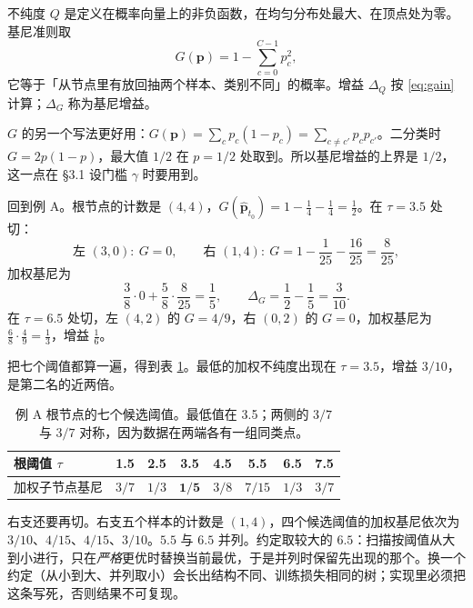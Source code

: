 \documentclass[11pt,a4paper,fontset=windows,zihao=-4]{ctexart}
\newcommand{\bp}{\mathbf{p}}
\newcommand{\tabhead}{\sffamily\bfseries\color{navy}}
\begin{document}
\begin{dfn}[不纯度与基尼增益]
不纯度 $Q$ 是定义在概率向量上的非负函数，在均匀分布处最大、在顶点处为零。基尼准则取
\[
  G(\bp)=1-\sum_{c=0}^{C-1}p_c^2 ,
\]
它等于「从节点里有放回抽两个样本、类别不同」的概率。增益 $\Delta_Q$ 按 \eqref{eq:gain} 计算；$\Delta_G$ 称为基尼增益。
\end{dfn}

$G$ 的另一个写法更好用：$G(\bp)=\sum_c p_c(1-p_c)=\sum_{c\ne c'}p_cp_{c'}$。二分类时 $G=2p(1-p)$，最大值 $1/2$ 在 $p=1/2$ 处取到。所以基尼增益的上界是 $1/2$，这一点在 §3.1 设门槛 $\gamma$ 时要用到。

回到例 A。根节点的计数是 $(4,4)$，$G(\widehat{\bp}_{t_0})=1-\frac14-\frac14=\frac12$。在 $\tau=3.5$ 处切：
\[
  \text{左 }(3,0):\ G=0,\qquad
  \text{右 }(1,4):\ G=1-\frac1{25}-\frac{16}{25}=\frac8{25},
\]
加权基尼为
\[
  \frac38\cdot0+\frac58\cdot\frac8{25}=\frac15,
  \qquad \Delta_G=\frac12-\frac15=\frac3{10}.
\]
在 $\tau=6.5$ 处切，左 $(4,2)$ 的 $G=4/9$，右 $(0,2)$ 的 $G=0$，加权基尼为 $\frac68\cdot\frac49=\frac13$，增益 $\frac16$。

把七个阈值都算一遍，得到表 \ref{tab:giniA}。最低的加权不纯度出现在 $\tau=3.5$，增益 $3/10$，是第二名的近两倍。

\begin{table}[htbp]
\centering
\small
\begin{tabular}{@{}lccccccc@{}}
\toprule
\rowcolor{navy!7}
\tabhead 根阈值 $\tau$ & 1.5 & 2.5 & 3.5 & 4.5 & 5.5 & 6.5 & 7.5\\
\midrule
加权子节点基尼 & $3/7$ & $1/3$ & $\mathbf{1/5}$ & $3/8$ & $7/15$ & $1/3$ & $3/7$\\
\bottomrule
\end{tabular}
\caption{例 A 根节点的七个候选阈值。最低值在 3.5；两侧的 $3/7$ 与 $3/7$ 对称，因为数据在两端各有一组同类点。}
\label{tab:giniA}
\end{table}

右支还要再切。右支五个样本的计数是 $(1,4)$，四个候选阈值的加权基尼依次为 $3/10$、$4/15$、$4/15$、$3/10$。$5.5$ 与 $6.5$ 并列。约定取较大的 $6.5$：扫描按阈值从大到小进行，只在\emph{严格}更优时替换当前最优，于是并列时保留先出现的那个。换一个约定（从小到大、并列取小）会长出结构不同、训练损失相同的树；实现里必须把这条写死，否则结果不可复现。
\end{document}
